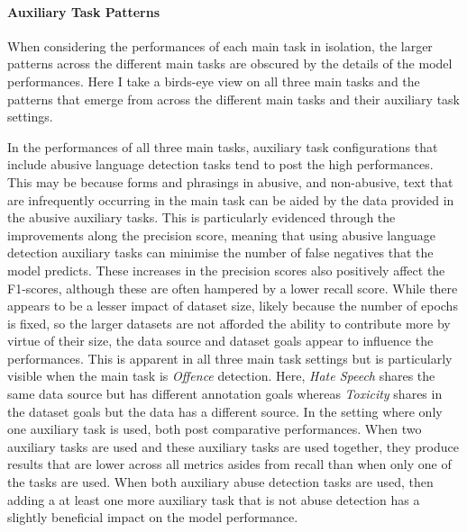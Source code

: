 
\paragraph{Auxiliary Task Patterns}
When considering the performances of each main task in isolation, the larger patterns across the different main tasks are obscured by the details of the model performances.
Here I take a birds-eye view on all three main tasks and the patterns that emerge from across the different main tasks and their auxiliary task settings.

In the performances of all three main tasks, auxiliary task configurations that include abusive language detection tasks tend to post the high performances.
This may be because forms and phrasings in abusive, and non-abusive, text that are infrequently occurring in the main task can be aided by the data provided in the abusive auxiliary tasks.
This is particularly evidenced through the improvements along the precision score, meaning that using abusive language detection auxiliary tasks can minimise the number of false negatives that the model predicts.
These increases in the precision scores also positively affect the F1-scores, although these are often hampered by a lower recall score.
While there appears to be a lesser impact of dataset size, likely because the number of epochs is fixed, so the larger datasets are not afforded the ability to contribute more by virtue of their size, the data source and dataset goals appear to influence the performances.
This is apparent in all three main task settings but is particularly visible when the main task is \textit{Offence} detection.
Here, \textit{Hate Speech} shares the same data source but has different annotation goals whereas \textit{Toxicity} shares in the dataset goals but the data has a different source.
In the setting where only one auxiliary task is used, both post comparative performances.
When two auxiliary tasks are used and these auxiliary tasks are used together, they produce results that are lower across all metrics asides from recall than when only one of the tasks are used.
When both auxiliary abuse detection tasks are used, then adding a at least one more auxiliary task that is not abuse detection has a slightly beneficial impact on the model performance.

